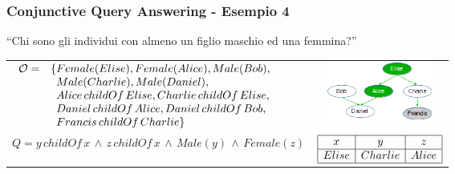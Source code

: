 \documentclass[8pt]{beamer}
\begin{document}
\begin{frame}
\frametitle{Conjunctive Query Answering - Esempio 4}
\begin{center}
``Chi sono gli individui con almeno un figlio maschio ed una femmina?''
\end{center}

\begin{tabular}{lc}
$\begin{array}{cl}
  \Ont  =  &  \{Female(Elise),  Female(Alice), Male(Bob), \\
  &\phantom{\{}Male(Charlie), Male(Daniel), \\
  &\phantom{\{}Alice\,childOf\,Elise, Charlie\,childOf\,Elise, \\
  &\phantom{\{}Daniel\,childOf\,Alice, Daniel\,childOf\,Bob, \\
  &\phantom{\{}Francis\,childOf\,Charlie \}\\
\end{array}$ & \includegraphics[width=130px]{family.png} \\
$Q=y\,childOf\,x\,\wedge\,z\,childOf\,x\,\wedge\,Male(y)\,\wedge\,Female(z)$ &
$\begin{array}{|c|c|c|}
  \hline
  x&y&z\\
  \hline
  Elise&Charlie&Alice\\
  \hline
\end{array}$ \\
\end{tabular}
\end{frame}
\end{document}
